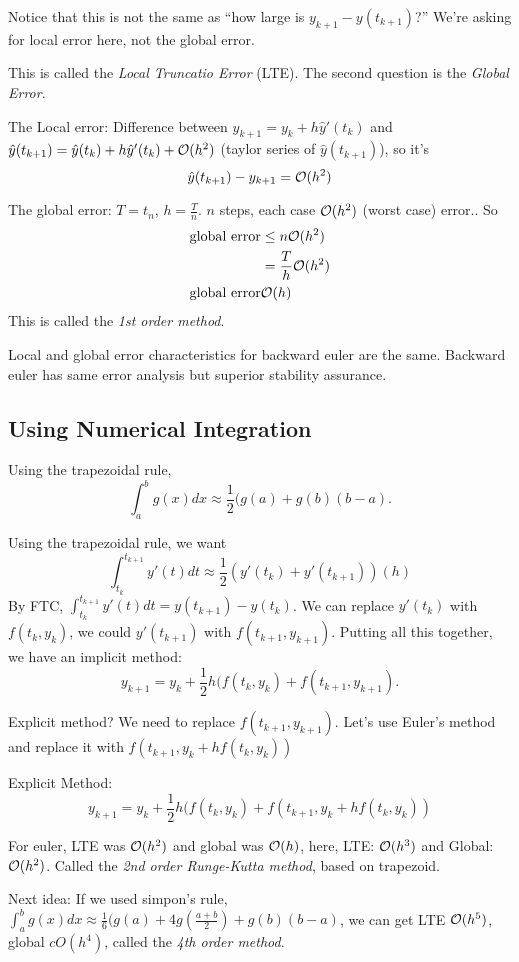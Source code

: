 Notice that this is not the same as ``how large is $y_{k+1} -
y(t_{k+1})$?'' We're asking for local error here, not the global
error.

This is called the \emph{Local Truncatio Error} (LTE).
The second question is the \emph{Global Error}.

The Local error:
Difference between $y_{k+1} = y_k + h \hat y'(t_k)$ and $\hat y(t_{k+1}) = \hat y(t_k) +
h \hat y'(t_k) + \mathcal{O}(h^2)$ (taylor series of $\hat y(t_{k+1})$), so
it's 
$$\hat y(t_{k+1}) - y_{k+1} =\mathcal{O}(h^2)$$

The global error: $T = t_n$, $h=\frac{T}{n}$. $n$ steps, each case
$\mathcal{O}(h^2)$ (worst case) error..
So 
\begin{align*}
\text{global error} &\le n\mathcal{O}(h^2)\\
&= \frac{T}{h}\mathcal{O}(h^2)\\  
\text{global error} &\mathcal{O}(h)\\
\end{align*}
This is called the \emph{1st order method}.

Local and global error characteristics for backward euler are the
same.
Backward euler has same error analysis but superior stability
assurance.

\subsection{Using Numerical Integration}
Using the trapezoidal rule, 
$$\int_a^b g(x)dx \approx \frac{1}{2}(g(a)+g(b)(b-a).$$

Using the trapezoidal rule, we want $$\int_{t_k}^{t_{k+1}}y'(t)dt \approx \frac{1}{2}(y'(t_k) + y'(t_{k+1}))(h)$$
By FTC, $\int_{t_k}^{t_{k+1}}y'(t)dt = y(t_{k+1}) - y(t_k)$. We can replace $y'(t_k)$  with $f(t_k,y_k)$, we could $y'(t_{k+1})$
with $f(t_{k+1}, y_{k+1})$. Putting all this together, we have an implicit method: $$y_{k+1}
= y_k + \frac{1}{2}h(f(t_k, y_k) + f(t_{k+1}, y_{k+1}).$$

Explicit method? We need to replace $f(t_{k+1}, y_{k+1})$. Let's use
Euler's method and replace it with $f(t_{k+1}, y_k + hf(t_k, y_k))$

Explicit Method: $$y_{k+1}= y_k + \frac{1}{2}h(f(t_k, y_k) +
f(t_{k+1}, y_k + hf(t_k, y_k))$$

 For euler, LTE was $\mathcal{O}(h^2)$ and global was
$\mathcal{O}(h)$, here, LTE: $\mathcal{O}(h^3)$ and Global: $\mathcal{O}(h^2)$. Called the \emph{2nd
order Runge-Kutta method}, based on trapezoid. 

Next idea: If we used simpon's rule, $\int_a^b g(x)dx \approx \frac{1}{6}(g(a)+4g(\frac{a+b}{2})+g(b)(b-a)$, we can get LTE $\mathcal{O}(h^5)$, global
$cO(h^4)$, called the \emph{4th order method}.

